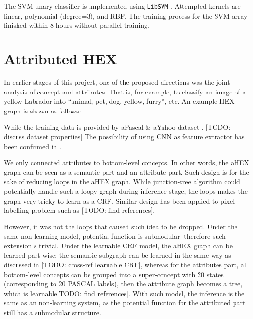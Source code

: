 \documentclass[11pt,a4paper]{article}
\begin{document}
The SVM unary classifier is implemented using \texttt{LibSVM} \cite{libsvm}. Attempted kernels are linear, polynomial (degree=3), and RBF. The training process for the SVM array finished within 8 hours without parallel training.

\section{Attributed HEX}

In earlier stages of this project, one of the proposed directions was the joint analysis of concept and attributes. That is, for example, to classify an image of a yellow Labrador into ``animal, pet, dog, yellow, furry'', etc. An example HEX graph is shown as follows:

While the training data is provided by aPascal \& aYahoo dataset \cite{farhadi2009describing}. [TODO: discuss dataset properties] The possibility of using CNN as feature extractor has been confirmed in \cite{razavian2014cnn}.

We only connected attributes to bottom-level concepts. In other words, the aHEX graph can be seen as a semantic part and an attribute part. Such design is for the sake of reducing loops in the aHEX graph. While junction-tree algorithm could potentially handle such a loopy graph during inference stage, the loops makes the graph very tricky to learn as a CRF. Similar design has been applied to pixel labelling problem such as [TODO: find references].

However, it was not the loops that caused such idea to be dropped. Under the same non-learning model, potential function is submodular, therefore such extension s trivial. Under the learnable CRF model, the aHEX graph can be learned part-wise: the semantic subgraph can be learned in the same way as discussed in [TODO: cross-ref learnable CRF], whereas for the attributes part, all bottom-level concepts can be grouped into a super-concept with 20 states (corresponding to 20 PASCAL labels), then the attribute graph becomes a tree, which is learnable[TODO: find references]. With such model, the inference is the same as an non-learning system, as the potential function for the attributed part still has a submodular structure.

\clearpage


\end{document}
